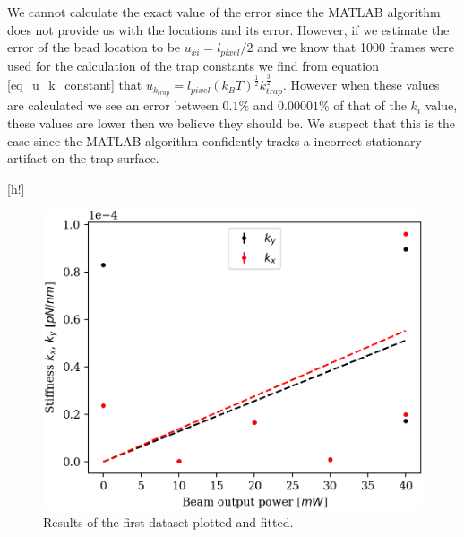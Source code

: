 We cannot calculate the exact value of the error since the MATLAB algorithm does not provide us with the locations and its error. However, if we estimate the error of the bead location to be $u_{xi} = l_{pixel}/2$ and we know that 1000 frames were used for the calculation of the trap constants we find from equation \ref{eq_u_k_constant} that $u_{k_{trap}} = l_{pixel} (k_B T)^{\frac{1}{2}}  k_{trap} ^{\frac{3}{2}}$. However when these values are calculated we see an error between $0.1\%$ and $0.00001\%$ of that of the $k_{i}$ value, these values are lower then we believe they should be. We suspect that this is the case since the MATLAB algorithm confidently tracks a incorrect stationary artifact on the trap surface.


\begin{minipage}{\linewidth}[h!]
    \begin{minipage}[l]{0.45\linewidth}
        \begin{figure}[H]
            \centering
            \includegraphics[width=\linewidth]{figures/beam.png}
            \caption{Results of the first dataset plotted and fitted.\\}
            \label{fig:bead-plot}
        \end{figure}
    \end{minipage}
    \hfill
    \begin{minipage}[r]{0.45\linewidth}
        \begin{figure}[H]
            \centering

\end{figure}
\end{minipage}
\end{minipage}
